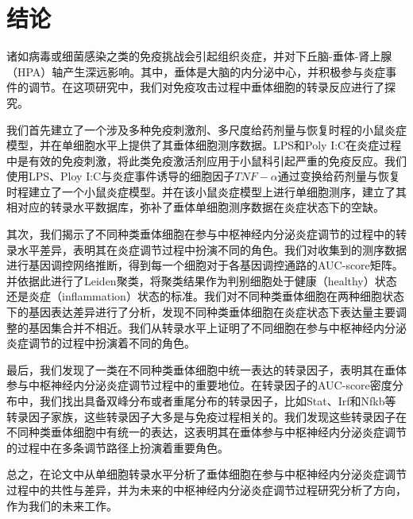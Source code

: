 
\chapter{结论}
  诸如病毒或细菌感染之类的免疫挑战会引起组织炎症，并对下丘脑­-垂体­-肾上腺（HPA）轴产生深远影响。其中，垂体是大脑的内分泌中心，并积极参与炎症事件的调节。在这项研究中，我们对免疫攻击过程中垂体细胞的转录反应进行了探究。

  我们首先建立了一个涉及多种免疫刺激剂、多尺度给药剂量与恢复时程的小鼠炎症模型，并在单细胞水平上提供了其垂体细胞测序数据。LPS和Poly I:C在炎症过程中是有效的免疫刺激，将此类免疫激活剂应用于小鼠科引起严重的免疫反应。我们使用LPS、Ploy I:C与炎症事件诱导的细胞因子$TNF-\alpha$通过变换给药剂量与恢复时程建立了一个小鼠炎症模型。并在该小鼠炎症模型上进行单细胞测序，建立了其相对应的转录水平数据库，弥补了垂体单细胞测序数据在炎症状态下的空缺。

  其次，我们揭示了不同种类垂体细胞在参与中枢神经内分泌炎症调节的过程中的转录水平差异，表明其在炎症调节过程中扮演不同的角色。我们对收集到的测序数据进行基因调控网络推断，得到每一个细胞对于各基因调控通路的AUC-score矩阵。并依据此进行了Leiden聚类，将聚类结果作为判别细胞处于健康（healthy）状态还是炎症（inflammation）状态的标准。我们对不同种类垂体细胞在两种细胞状态下的基因表达差异进行了分析，发现不同种类垂体细胞在炎症状态下表达量主要调整的基因集合并不相近。我们从转录水平上证明了不同细胞在参与中枢神经内分泌炎症调节的过程中扮演着不同的角色。

  最后，我们发现了一类在不同种类垂体细胞中统一表达的转录因子，表明其在垂体参与中枢神经内分泌炎症调节过程中的重要地位。在转录因子的AUC-score密度分布中，我们找出具备双峰分布或者重尾分布的转录因子，比如Stat、Irf和Nfkb等转录因子家族，这些转录因子大多是与免疫过程相关的。我们发现这些转录因子在不同种类垂体细胞中有统一的表达，这表明其在垂体参与中枢神经内分泌炎症调节的过程中在多条调节路径上扮演着重要角色。

  总之，在论文中从单细胞转录水平分析了垂体细胞在参与中枢神经内分泌炎症调节过程中的共性与差异，并为未来的中枢神经内分泌炎症调节过程研究分析了方向，作为我们的未来工作。

